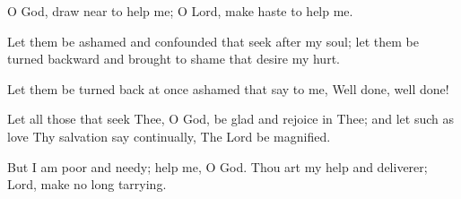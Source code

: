 O God, draw near to help me; O Lord, make haste to help me.

Let them be ashamed and confounded that seek after my soul; let them be turned backward and brought to shame that desire my
hurt.

Let them be turned back at once ashamed that say to me, Well done, well done!

Let all those that seek Thee, O God, be glad and rejoice in Thee; and let such as love Thy salvation say continually, The Lord be magnified.

But I am poor and needy; help me, O God. Thou art my help and deliverer; Lord, make no long tarrying.
